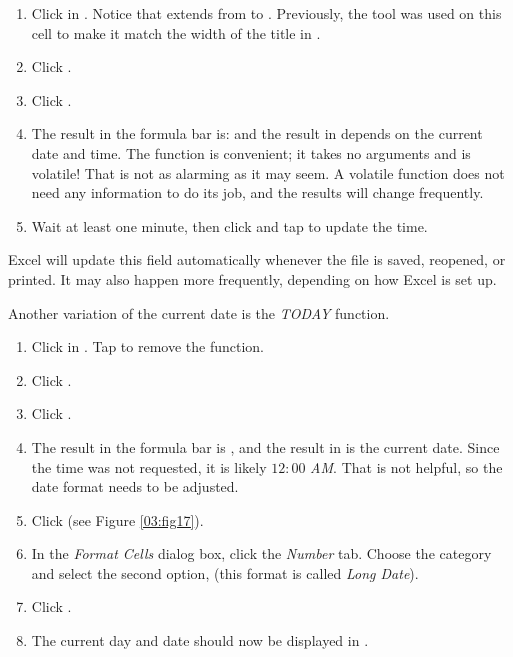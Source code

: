 \begin{enumbox}
	\begin{enumerate}
		\item Click in . Notice that  extends from  to . Previously, the  tool was used on this cell to make it match the width of the title in .
		\item Click . 
		\item Click .
		\item The result in the formula bar is:  and the result in  depends on the current date and time. The  function is convenient; it takes no arguments and is volatile! That is not as alarming as it may seem. A volatile function does not need any information to do its job, and the results will change frequently. 
		\item Wait at least one minute, then click  and tap  to update the time.
	\end{enumerate}
\end{enumbox}
	
Excel will update this field automatically whenever the file is saved, reopened, or printed. It may also happen more frequently, depending on how Excel is set up.

Another variation of the current date is the \textit{TODAY} function.

\begin{enumbox}
	\begin{enumerate}
		\item Click in . Tap  to remove the  function.
		\item Click . 
		\item Click .
		\item The result in the formula bar is , and the result in  is the current date. Since the time was not requested, it is likely $ 12\!:\!00 $\textit{ AM}. That is not helpful, so the date format needs to be adjusted.
		\item Click  (see Figure \ref{03:fig17}).
		\item In the \textit{Format Cells} dialog box, click the \textit{Number} tab. Choose the  category and select the second option,  (this format is called \textit{Long Date}).
		\item Click .
		\item The current day and date should now be displayed in .
	\end{enumerate}
\end{enumbox}
	
